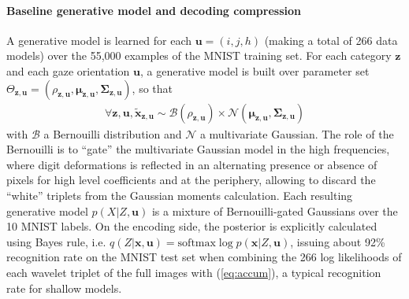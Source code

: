 \documentclass{article}
\begin{document}
\paragraph{Baseline generative model and decoding compression}
A generative model is learned for each $\boldsymbol{u} = (i,j,h)$ (making a total of 266 data models) over the 55,000 examples of the MNIST training set. For each category $\boldsymbol{z}$ and each gaze orientation $\boldsymbol{u}$, a generative model is built over parameter set $\Theta_{\boldsymbol{z},\boldsymbol{u}} = (\rho_{\boldsymbol{z},\boldsymbol{u}}, \boldsymbol{\mu}_{\boldsymbol{z},\boldsymbol{u}}, \boldsymbol{\Sigma}_{\boldsymbol{z},\boldsymbol{u}})$, so that 
\begin{align}
\forall \boldsymbol{z},\boldsymbol{u}, \tilde{\boldsymbol{x}}_{\boldsymbol{z},\boldsymbol{u}} \sim \mathcal{B}(\rho_{\boldsymbol{z},\boldsymbol{u}}) \times \mathcal{N}(\boldsymbol{\mu}_{\boldsymbol{z},\boldsymbol{u}}, \boldsymbol{\Sigma}_{\boldsymbol{z},\boldsymbol{u}})\label{eq:bernouilli-gated}
\end{align} 
with $\mathcal{B}$ a Bernouilli distribution and $\mathcal{N}$ a multivariate Gaussian. The role of the Bernouilli is to ``gate'' the multivariate Gaussian model in the high frequencies, where digit deformations is reflected in an alternating presence or absence of pixels for high level coefficients and at the periphery, allowing to discard the ``white'' triplets from the Gaussian moments calculation. Each resulting generative model $p(X|Z,\boldsymbol{u})$ is a mixture of Bernouilli-gated Gaussians over the 10 MNIST labels. On the encoding side, the posterior is explicitly calculated using Bayes rule, i.e. $q(Z|\boldsymbol{x},\boldsymbol{u}) = \text{softmax} \log p(\boldsymbol{x}|Z,\boldsymbol{u})$, issuing about 92\% recognition rate on the MNIST test set when combining the 266 log likelihoods of each wavelet triplet of the full images with (\ref{eq:accum}), a typical recognition rate for shallow models.
\end{document}
